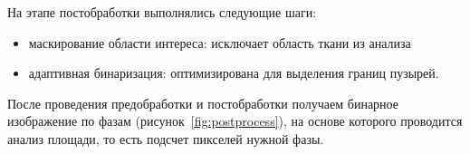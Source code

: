 На этапе постобработки выполнялись следующие шаги:
\begin{itemize}
    \item маскирование области интереса: исключает область ткани из анализа
    \item адаптивная бинаризация: оптимизирована для выделения границ пузырей.
\end{itemize}

После проведения предобработки и постобработки получаем бинарное изображение по фазам (рисунок~\ref{fig:postprocess}), на основе которого проводится анализ площади, то есть подсчет пикселей нужной фазы. 